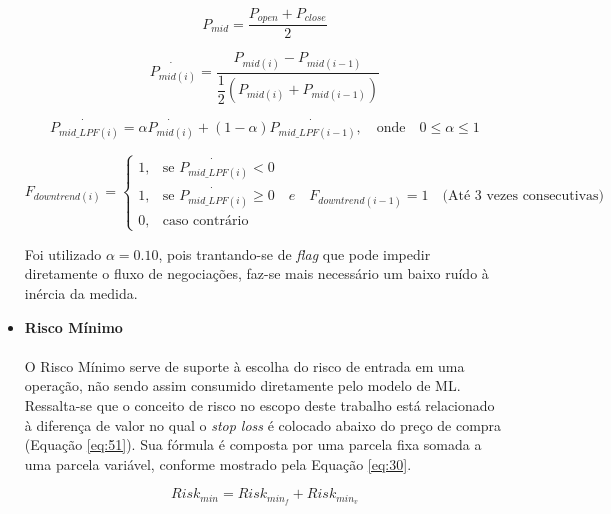 \begin{itemize}
    \begin{equation} \label{eq:22}
        P_{mid} = \dfrac{P_{open} + P_{close}}{2}
    \end{equation}

    \begin{equation} \label{eq:23}
        \dot{P_{mid(i)}} = \dfrac{ P_{mid(i)} - P_{mid(i-1)} }{ \dfrac{1}{2}(P_{mid(i)} + P_{mid(i-1)}) }
    \end{equation}

    \begin{equation} \label{eq:24}
        \dot{P_{mid\_LPF(i)}} = \alpha \dot{P_{mid(i)}} + (1 - \alpha) \dot{P_{mid\_LPF(i-1)}},  \quad \textrm{onde} \quad 0 \le \alpha \le 1
    \end{equation}

    \begin{equation} \label{eq:25}
        F_{downtrend(i)} = \begin{cases} 1, & \mbox{se } \dot{P_{mid\_LPF(i)}} < 0 \\ 1, & \mbox{se } \dot{P_{mid\_LPF(i)}} \ge 0 \quad e \quad F_{downtrend(i-1)} = 1 \quad \textrm{(At\'e 3 vezes consecutivas)} \\ 0, & \mbox{caso contr\'ario} \end{cases}
    \end{equation}

    Foi utilizado \begin{math} \alpha = 0.10 \end{math}, pois trantando-se de \textit{flag} que pode impedir diretamente o fluxo de negociações, faz-se mais necessário um baixo ruído à inércia da medida. \\

    \item \textbf{Risco Mínimo} \\ \\
    O Risco Mínimo serve de suporte à escolha do risco de entrada em uma operação, não sendo assim consumido diretamente pelo modelo de ML. Ressalta-se que o conceito de risco no escopo deste trabalho está relacionado à diferença de valor no qual o \textit{stop loss} é colocado abaixo do preço de compra (Equação \ref{eq:51}). Sua fórmula é composta por uma parcela fixa somada a uma parcela variável, conforme mostrado pela Equação \ref{eq:30}.

    \begin{equation} \label{eq:30}
        Risk_{min} = Risk_{min_f} + Risk_{min_v}
    \end{equation}


\end{itemize}

